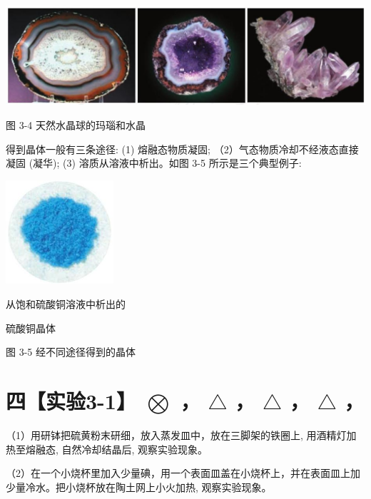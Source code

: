 \documentclass[10pt]{article}
\begin{document}
\begin{center}
\includegraphics[max width=1.0\textwidth]{images/0190e026-5a11-7df7-bd27-54d09026ba7a_73_701370.jpg}
\end{center}

图 3-4 天然水晶球的玛瑙和水晶

得到晶体一般有三条途径: (1) 熔融态物质凝固; （2）气态物质冷却不经液态直接凝固 (凝华); (3) 溶质从溶液中析出。如图 3-5 所示是三个典型例子:


\begin{center}
\includegraphics[max width=0.3\textwidth]{images/0190e026-5a11-7df7-bd27-54d09026ba7a_74_337054.jpg}
\end{center}

从饱和硫酸铜溶液中析出的

硫酸铜晶体

图 3-5 经不同途径得到的晶体

\section*{四【实验3-1】 \(\bigotimes\) ， \(\bigtriangleup\) ， \(\bigtriangleup\) ， \(\bigtriangleup\) ，}

（1）用研钵把硫黄粉末研细，放入蒸发皿中，放在三脚架的铁圈上, 用酒精灯加热至熔融态, 自然冷却结晶后, 观察实验现象。

（2）在一个小烧杯里加入少量碘，用一个表面皿盖在小烧杯上，并在表面皿上加少量冷水。把小烧杯放在陶土网上小火加热, 观察实验现象。
\end{document}
